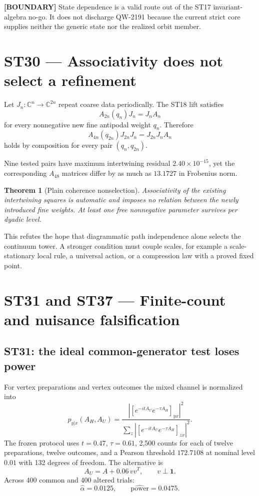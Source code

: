 \documentclass[11pt,a4paper]{article}
\newtheorem{theorem}{Theorem}[section]
\newcommand{\statusboundary}{\textcolor{orange!80!black}{\textbf{[BOUNDARY]}}}
\begin{document}
\statusboundary{} State dependence is a valid route out of the ST17 invariant-algebra no-go. It does not discharge QW-2191 because the current strict core supplies neither the generic state nor the realized orbit member.

\section{ST30 --- Associativity does not select a refinement}

Let $J_n:\mathbb C^n\to\mathbb C^{2n}$ repeat coarse data periodically. The ST18 lift satisfies
\[
A_{2n}(q_n)J_n=J_nA_n
\]
for every nonnegative new fine antipodal weight $q_n$. Therefore
\[
A_{4n}(q_{2n})J_{2n}J_n=J_{2n}J_nA_n
\]
holds by composition for every pair $(q_n,q_{2n})$.

Nine tested pairs have maximum intertwining residual $2.40\times10^{-15}$, yet the corresponding $A_{48}$ matrices differ by as much as $13.1727$ in Frobenius norm.

\begin{theorem}[Plain coherence nonselection]
Associativity of the existing intertwining squares is automatic and imposes no relation between the newly introduced fine weights. At least one free nonnegative parameter survives per dyadic level.
\end{theorem}

This refutes the hope that diagrammatic path independence alone selects the continuum tower. A stronger condition must couple scales, for example a scale-stationary local rule, a universal action, or a compression law with a proved fixed point.

\section{ST31 and ST37 --- Finite-count and nuisance falsification}

\subsection{ST31: the ideal common-generator test loses power}

For vertex preparations and vertex outcomes the mixed channel is normalized into
\[
p_{y|x}(A_H,A_U)=
\frac{|[e^{-itA_U}e^{-\tau A_H}]_{yx}|^2}
{\sum_z|[e^{-itA_U}e^{-\tau A_H}]_{zx}|^2}.
\]
The frozen protocol uses $t=0.47$, $\tau=0.61$, 2,500 counts for each of twelve preparations, twelve outcomes, and a Pearson threshold $172.7108$ at nominal level $0.01$ with 132 degrees of freedom. The alternative is
\[
A_U=A+0.06\,vv^T,\qquad v\perp\bm1.
\]
Across 400 common and 400 altered trials:
\[
\widehat{\alpha}=0.0125,\qquad \widehat{\text{power}}=0.0475.
\]
\end{document}
